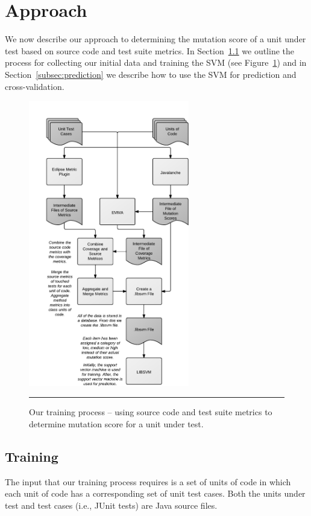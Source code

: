 \documentclass[conference]{IEEEtran}
\begin{document}
\section{Approach}
\label{sec:approach}
We now describe our approach to determining the mutation score of a unit under test based on source code and test suite metrics. In Section~\ref{subsec:training} we outline the process for collecting our initial data and training the SVM (see Figure~\ref{fig:process}) and in Section~\ref{subsec:prediction} we describe how to use the SVM for prediction and cross-validation.

\begin{figure}[!t]
  \centering
  \includegraphics[width=7cm]{figures/process.pdf}
  \caption{Our training process -- using source code and test suite metrics to determine mutation score for a unit under test.}
  \label{fig:process}
  \vspace{2mm}
  \hrule
\end{figure}


\subsection{Training}
\label{subsec:training}
The input that our training process requires is a set of units of code in which each unit of code has a corresponding set of unit test cases. Both the units under test and test cases (i.e., JUnit tests) are Java source files.
\end{document}
